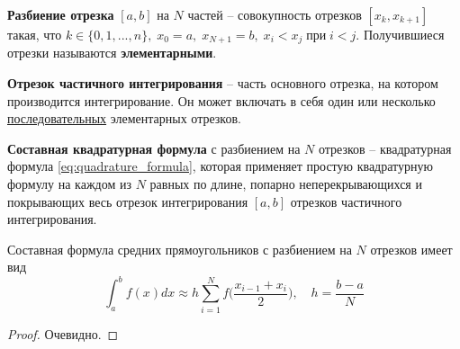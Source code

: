\documentclass[../main.tex]{subfile}
\begin{document}
\begin{define}
	\textbf{Разбиение отрезка} $[a,b]$ на $N$ частей -- совокупность
	отрезков $[x_k,x_{k+1}]$ такая, что $k\in\{0,1,...,n\},\;x_0=a,\;x_{N+1}
	=b,\;x_i<x_j\;\text{при}\;i<j$. Получившиеся отрезки называются
	\textbf{элементарными}.
\end{define}

\begin{define}
	\textbf{Отрезок частичного интегрирования} -- часть основного отрезка,
	на котором производится интегрирование. Он может включать в себя один
	или несколько \underline{последовательных} элементарных отрезков.
\end{define}

\begin{define}
	\textbf{Составная квадратурная формула} с разбиением на $N$ отрезков --
	квадратурная формула \eqref{eq:quadrature_formula}, которая применяет
	простую квадратурную формулу на каждом из $N$ равных по длине, попарно
	неперекрывающихся и покрывающих весь отрезок интегрирования $[a,b]$
	отрезков частичного интегрирования.
\end{define}
\newpage

\begin{theorem}
	Составная формула средних прямоугольников с разбиением на $N$ отрезков
	имеет вид
	\[\boxed{\int_a^b f(x)dx\approx h\sum_{i=1}^{N}f\Big(\frac{x_{i-1}+x_i}
	{2}\Big),\quad h=\frac{b-a}{N}}\]
\end{theorem}

\begin{proof}
	Очевидно.
\end{proof}
\end{document}
